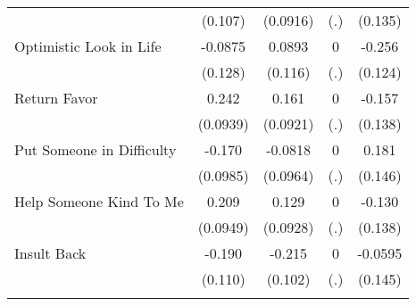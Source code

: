 {\begin{tabular}{l*{4}{c}}
            &     (0.107)         &    (0.0916)         &         (.)         &     (0.135)         \\
[1em]
Optimistic Look in Life&     -0.0875         &      0.0893         &           0         &      -0.256\sym{*}  \\
            &     (0.128)         &     (0.116)         &         (.)         &     (0.124)         \\
[1em]
Return Favor&       0.242\sym{**} &       0.161         &           0         &      -0.157         \\
            &    (0.0939)         &    (0.0921)         &         (.)         &     (0.138)         \\
[1em]
Put Someone in Difficulty&      -0.170         &     -0.0818         &           0         &       0.181         \\
            &    (0.0985)         &    (0.0964)         &         (.)         &     (0.146)         \\
[1em]
Help Someone Kind To Me&       0.209\sym{*}  &       0.129         &           0         &      -0.130         \\
            &    (0.0949)         &    (0.0928)         &         (.)         &     (0.138)         \\
[1em]
Insult Back &      -0.190         &      -0.215\sym{*}  &           0         &     -0.0595         \\
            &     (0.110)         &     (0.102)         &         (.)         &     (0.145)         \\
\hline\hline
{}\\
\end{tabular}
}
